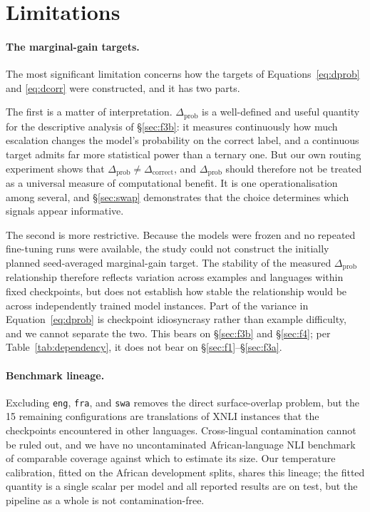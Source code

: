 \documentclass[11pt]{article}
\newcommand{\claim}[1]{#1}   %
\begin{document}
\section{Limitations}
\label{sec:limitations}

\paragraph{The marginal-gain targets.} The most significant limitation concerns
how the targets of Equations~\ref{eq:dprob} and \ref{eq:dcorr} were constructed,
and it has two parts.

The first is a matter of interpretation. $\Delta_{\mathrm{prob}}$ is a
well-defined and useful quantity for the descriptive analysis of
\S\ref{sec:f3b}: it measures continuously how much escalation changes the model's
probability on the correct label, and a continuous target admits far more
statistical power than a ternary one. \claim{But our own routing experiment shows
that $\Delta_{\mathrm{prob}} \neq \Delta_{\mathrm{correct}}$, and
$\Delta_{\mathrm{prob}}$ should therefore not be treated as a universal measure of
computational benefit.} It is one operationalisation among several, and
\S\ref{sec:swap} demonstrates that the choice determines which signals appear
informative.

The second is more restrictive. \claim{Because the models were frozen and no
repeated fine-tuning runs were available, the study could not construct the
initially planned seed-averaged marginal-gain target. The stability of the
measured $\Delta_{\mathrm{prob}}$ relationship therefore reflects variation across
examples and languages within fixed checkpoints, but does not establish how
stable the relationship would be across independently trained model instances.}
Part of the variance in Equation~\ref{eq:dprob} is checkpoint idiosyncrasy rather
than example difficulty, and we cannot separate the two. This bears on
\S\ref{sec:f3b} and \S\ref{sec:f4}; per Table~\ref{tab:dependency}, it does not
bear on \S\ref{sec:f1}--\S\ref{sec:f3a}.

\paragraph{Benchmark lineage.} Excluding \texttt{eng}, \texttt{fra}, and
\texttt{swa} removes the direct surface-overlap problem, but the 15 remaining
configurations are translations of XNLI instances that the checkpoints
encountered in other languages. Cross-lingual contamination cannot be ruled out,
and we have no uncontaminated African-language NLI benchmark of comparable
coverage against which to estimate its size. Our temperature calibration, fitted
on the African development splits, shares this lineage; the fitted quantity is a
single scalar per model and all reported results are on test, but the pipeline as
a whole is not contamination-free.
\end{document}
